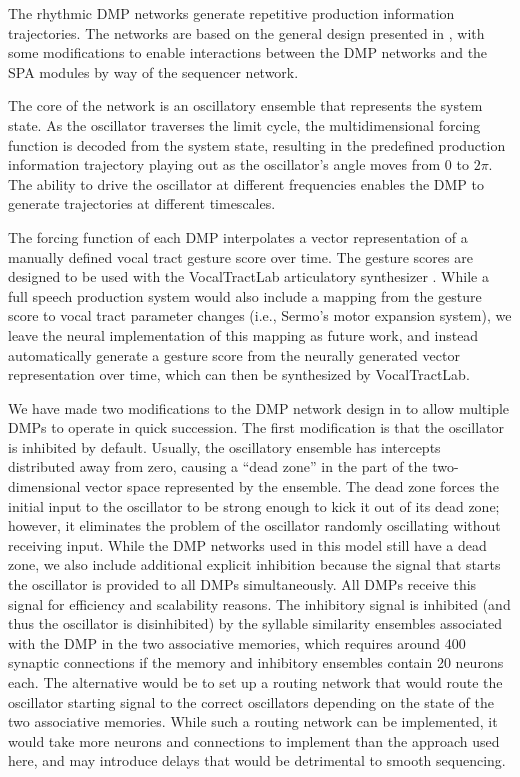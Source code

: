 The rhythmic DMP networks
generate repetitive
production information trajectories.
The networks are based on
the general design
presented in \citet{dewolf2015},
with some modifications
to enable interactions between
the DMP networks
and the SPA modules
by way of the sequencer network.

The core of the network
is an oscillatory ensemble
that represents the system state.
As the oscillator traverses
the limit cycle,
the multidimensional forcing function
is decoded from the system state,
resulting in the predefined
production information trajectory
playing out as
the oscillator's angle moves from $0$ to $2\pi$.
The ability to drive the oscillator
at different frequencies
enables the DMP to generate trajectories
at different timescales.

The forcing function of each DMP
interpolates a vector representation of
a manually defined
vocal tract gesture score over time.
The gesture scores are
designed to be used with the VocalTractLab
articulatory synthesizer
\citep{birkholz2006,birkholz2013}.
While a full speech production system
would also include a mapping from
the gesture score to
vocal tract parameter changes
(i.e., Sermo's motor expansion system),
we leave the neural implementation
of this mapping as future work,
and instead automatically generate
a gesture score from the neurally generated
vector representation over time,
which can then be synthesized
by VocalTractLab.

We have made two modifications
to the DMP network design
in \citet{dewolf2015}
to allow multiple DMPs
to operate in quick succession.
The first modification
is that the oscillator is inhibited
by default.
Usually, the oscillatory ensemble
has intercepts distributed away from zero,
causing a ``dead zone'' in the part of the
two-dimensional vector space represented
by the ensemble.
The dead zone forces the initial input
to the oscillator
to be strong enough
to kick it out of its dead zone;
however, it eliminates the problem
of the oscillator randomly
oscillating without receiving input.
While the DMP networks used in this model
still have a dead zone,
we also include additional explicit inhibition
because the signal that
starts the oscillator is provided
to all DMPs simultaneously.
All DMPs receive this signal
for efficiency and scalability reasons.
The inhibitory signal is inhibited
(and thus the oscillator is disinhibited)
by the syllable similarity ensembles
associated with the DMP
in the two associative memories,
which requires around 400 synaptic connections
if the memory and inhibitory ensembles
contain 20 neurons each.
The alternative would be to
set up a routing network
that would route the oscillator starting signal
to the correct oscillators depending on
the state of the two associative memories.
While such a routing network can be implemented,
it would take more neurons and connections
to implement than the approach used here,
and may introduce delays that
would be detrimental to smooth sequencing.

